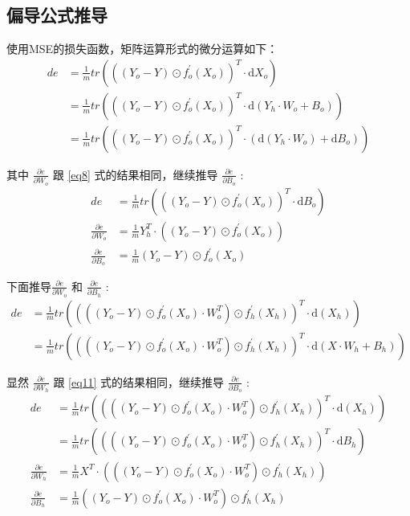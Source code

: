 \documentclass[12pt, a4paper, oneside]{ctexart}
\begin{document}
\subsection{偏导公式推导}
使用MSE的损失函数，矩阵运算形式的微分运算如下：
\begin{align}
    de &= \frac{1}{m}tr(((Y_o - Y) \odot f_o^{'}(X_o))^T \cdot \mathrm{d}X_o) \nonumber\\
       &= \frac{1}{m}tr(((Y_o - Y) \odot f_o^{'}(X_o))^T \cdot \mathrm{d}(Y_h \cdot W_o + B_o)) \nonumber\\
       &= \frac{1}{m}tr(((Y_o - Y) \odot f_o^{'}(X_o))^T \cdot (\mathrm{d}(Y_h \cdot W_o) + \mathrm{d}B_o)) \nonumber
\end{align}

其中 $\frac{\partial e}{\partial W_o}$ 跟 \eqref{eq8} 式的结果相同，继续推导 
$ \frac{\partial e}{\partial B_o} $ :
\begin{align}
de &= \frac{1}{m}tr(((Y_o - Y) \odot f_o^{'}(X_o))^T \cdot \mathrm{d}B_o) \nonumber\\
\frac{\partial e}{\partial W_o} &= \frac{1}{m}Y_h^T \cdot ((Y_o - Y) \odot f_o^{'}(X_o))    \nonumber\\
    \frac{\partial e}{\partial B_o} &= \frac{1}{m}(Y_o - Y) \odot f_o^{'}(X_o) \nonumber
\end{align}

下面推导$\frac{\partial e}{\partial W_o}$ 和 $ \frac{\partial e}{\partial B_h} $ :
\begin{align}
    de &= \frac{1}{m}tr((((Y_o - Y) \odot f_o^{'}(X_o) \cdot W_o^T) \odot f_h^{'}(X_h))^T \cdot \mathrm{d}(X_h) ) \nonumber \\
    &= \frac{1}{m}tr((((Y_o - Y) \odot f_o^{'}(X_o) \cdot W_o^T) \odot f_h^{'}(X_h))^T \cdot \mathrm{d}(X \cdot W_h + B_h) )  \nonumber
\end{align}

显然 $\frac{\partial e}{\partial W_h}$ 跟 \eqref{eq11} 式的结果相同，继续推导 $ \frac{\partial e}{\partial B_o} $ :
\begin{align}
    de &= \frac{1}{m}tr((((Y_o - Y) \odot f_o^{'}(X_o) \cdot W_o^T) \odot f_h^{'}(X_h))^T \cdot \mathrm{d}(X_h) ) \nonumber \\
    &= \frac{1}{m}tr((((Y_o - Y) \odot f_o^{'}(X_o) \cdot W_o^T) \odot f_h^{'}(X_h))^T \cdot \mathrm{d}B_h )  \nonumber\\    
    \frac{\partial e}{\partial W_h} &= \frac{1}{m}X^T \cdot (((Y_o - Y) \odot f_o^{'}(X_o) \cdot W_o^T) \odot f_h^{'}(X_h))  \nonumber\\
    \frac{\partial e}{\partial B_h} &= \frac{1}{m}((Y_o - Y) \odot f_o^{'}(X_o) \cdot W_o^T) \odot f_h^{'}(X_h) \nonumber
\end{align}
\end{document}
